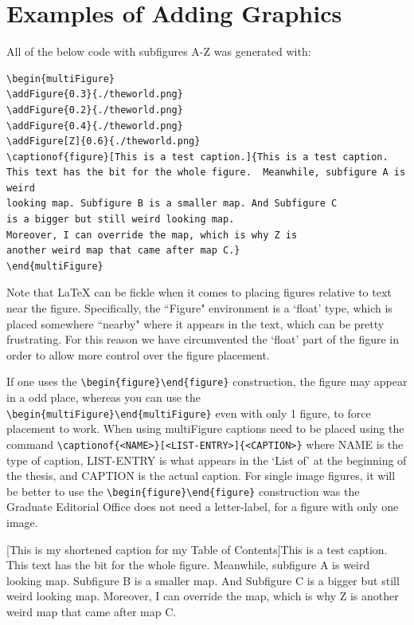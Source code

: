 \section{Examples of Adding Graphics}
\label{Sec:addingGraphics}
All of the below code with subfigures A-Z was generated with:
\begin{verbatim}
\begin{multiFigure}
\addFigure{0.3}{./theworld.png}
\addFigure{0.2}{./theworld.png}
\addFigure{0.4}{./theworld.png}
\addFigure[Z]{0.6}{./theworld.png}
\captionof{figure}[This is a test caption.]{This is a test caption. 
This text has the bit for the whole figure.  Meanwhile, subfigure A is weird 
looking map. Subfigure B is a smaller map. And Subfigure C 
is a bigger but still weird looking map. 
Moreover, I can override the map, which is why Z is 
another weird map that came after map C.}
\end{multiFigure}
\end{verbatim}
Note that \LaTeX{} can be fickle when it comes to placing figures relative to text near the figure. Specifically, the ``Figure" environment is a `float' type, which is placed somewhere ``nearby" where it appears in the text, which can be pretty frustrating. For this reason we have circumvented the `float' part of the figure in order to allow more control over the figure placement. 

If one uses the \verb|\begin{figure}\end{figure}| construction, the figure may appear in a odd place, whereas you can use the \verb|\begin{multiFigure}\end{multiFigure}| even with only 1 figure, to force placement to work. When using multiFigure captions need to be placed using the command \verb|\captionof{<NAME>}[<LIST-ENTRY>]{<CAPTION>}| where NAME is the type of caption, LIST-ENTRY is what appears in the `List of' at the beginning of the thesis, and CAPTION is the actual caption. For single image figures, it will be better to use the \verb|\begin{figure}\end{figure}| construction was the Graduate Editorial Office does not need a letter-label, for a figure with only one image. 

\begin{flushleft}
    \begin{multiFigure}
        \begin{center}
        \end{center}
[This is my shortened caption for my Table of Contents]{This is a test caption. This text has the bit for the whole figure. Meanwhile, subfigure A is weird looking map. Subfigure B is a smaller map. And Subfigure C is a bigger but still weird looking map. Moreover, I can override the map, which is why Z is another weird map that came after map C.}
\end{multiFigure}
\end{flushleft}


